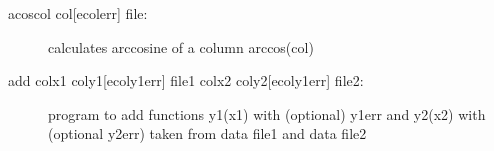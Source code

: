 \begin{description}
\item [\prg acoscol\label{acoscol} col{[ecolerr]} file:] calculates arccosine of a column arccos(col) 
\item [\prg add\label{add} colx1 coly1{[ecoly1err]} file1 colx2 coly2{[ecoly1err]} file2:] 
   program to add functions y1(x1) with (optional) y1err and y2(x2) with (optional y2err)
       taken from data file1 and data file2


\end{description}
